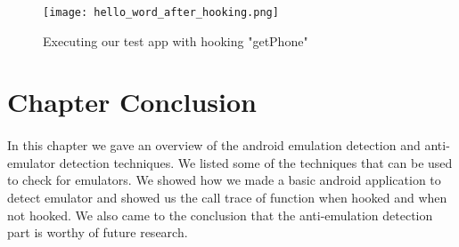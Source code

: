 \documentclass[../main.tex]{subfile}
\begin{document}
		\begin{figure}[H]
			\centering
			\texttt{[image: hello\_word\_after\_hooking.png]}
			\caption{Executing our test app with hooking  "getPhone"}
			\label{fig:hooking_execute}			
		\end{figure}	
	
	
	\section{Chapter Conclusion}
	\paragraph{} In this chapter we gave an overview of the android emulation detection and anti-emulator detection techniques. We listed some of the techniques that can be used to check for emulators. We showed how we made a basic android application to detect emulator and showed us the call trace of function when hooked and when not hooked. We also came to the conclusion that the anti-emulation detection part is worthy of future research.
			
\end{document}
